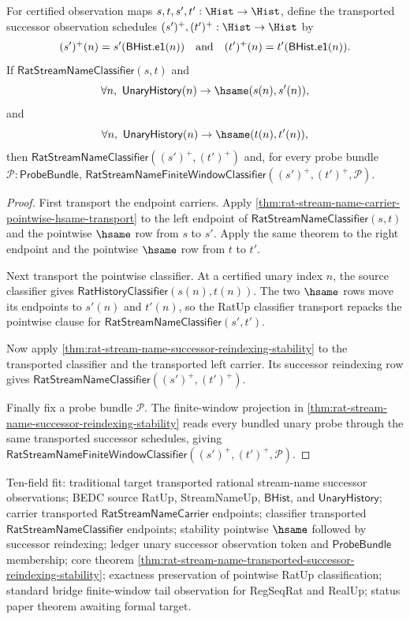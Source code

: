 \begin{theorem}
\label{thm:rat-stream-name-transported-successor-reindexing-stability}
For certified observation maps $s,t,s',t':\Hist\to\Hist$, define the
transported successor observation schedules $(s')^+,(t')^+:\Hist\to\Hist$ by
$$
(s')^+(n)=s'(\mathsf{BHist.e1}(n))
\quad\hbox{and}\quad
(t')^+(n)=t'(\mathsf{BHist.e1}(n)).
$$
If $\mathsf{RatStreamNameClassifier}(s,t)$ and
$$
\forall n,\ \mathsf{UnaryHistory}(n)\to\hsame(s(n),s'(n)),
$$
and
$$
\forall n,\ \mathsf{UnaryHistory}(n)\to\hsame(t(n),t'(n)),
$$
then $\mathsf{RatStreamNameClassifier}((s')^+,(t')^+)$ and, for every probe
bundle $\mathcal{P}:\mathsf{ProbeBundle}$,
$\mathsf{RatStreamNameFiniteWindowClassifier}((s')^+,(t')^+,\mathcal{P})$.
\end{theorem}
\begin{proof}
First transport the endpoint carriers. Apply
\autoref{thm:rat-stream-name-carrier-pointwise-hsame-transport} to the left
endpoint of $\mathsf{RatStreamNameClassifier}(s,t)$ and the pointwise
$\hsame$ row from $s$ to $s'$. Apply the same theorem to the right endpoint
and the pointwise $\hsame$ row from $t$ to $t'$.

Next transport the pointwise classifier. At a certified unary index $n$, the
source classifier gives $\mathsf{RatHistoryClassifier}(s(n),t(n))$. The two
$\hsame$ rows move its endpoints to $s'(n)$ and $t'(n)$, so the RatUp
classifier transport repacks the pointwise clause for
$\mathsf{RatStreamNameClassifier}(s',t')$.

Now apply \autoref{thm:rat-stream-name-successor-reindexing-stability} to the
transported classifier and the transported left carrier. Its successor
reindexing row gives
$\mathsf{RatStreamNameClassifier}((s')^+,(t')^+)$.

Finally fix a probe bundle $\mathcal{P}$. The finite-window projection in
\autoref{thm:rat-stream-name-successor-reindexing-stability} reads every
bundled unary probe through the same transported successor schedules, giving
$\mathsf{RatStreamNameFiniteWindowClassifier}((s')^+,(t')^+,\mathcal{P})$.
\end{proof}

Ten-field fit: traditional target transported rational stream-name successor
observations; BEDC source RatUp, StreamNameUp, $\mathsf{BHist}$, and
$\mathsf{UnaryHistory}$; carrier transported
$\mathsf{RatStreamNameCarrier}$ endpoints; classifier transported
$\mathsf{RatStreamNameClassifier}$ endpoints; stability pointwise $\hsame$
followed by successor reindexing; ledger unary successor observation token and
$\mathsf{ProbeBundle}$ membership; core theorem
\autoref{thm:rat-stream-name-transported-successor-reindexing-stability};
exactness preservation of pointwise RatUp classification; standard bridge
finite-window tail observation for RegSeqRat and RealUp; status paper theorem
awaiting formal target.

